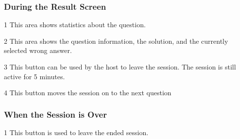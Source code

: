 \subsubsection{During the Result Screen}
\begin{userManualItemlist}
    \item[1] This area shows statistics about the question.
    \item[2] This area shows the question information, the solution, and the currently selected wrong answer.
    \item[3] This button can be used by the host to leave the session. The session is still active for 5 minutes.
    \item[4] This button moves the session on to the next question  
\end{userManualItemlist}

\subsubsection{When the Session is Over}
\begin{userManualItemlist}
    \item[1] This button is used to leave the ended session.
\end{userManualItemlist}